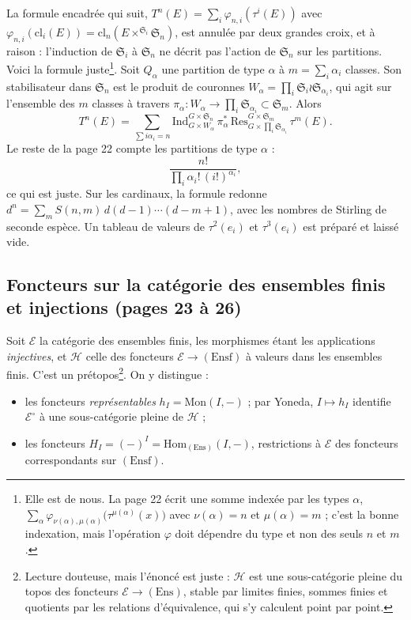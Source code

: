 \documentclass[11pt,a4paper]{article}
\begin{document}
La formule encadrée qui suit, $T^{n}(E) = \sum_i \varphi_{n,i}(\tau^{i}(E))$
avec $\varphi_{n,i}(\mathrm{cl}_i(E)) = \mathrm{cl}_n(E
\times^{\mathfrak{S}_i} \mathfrak{S}_n)$, est annulée par deux grandes
croix, et à raison : l'induction de $\mathfrak{S}_i$ à $\mathfrak{S}_n$ ne
décrit pas l'action de $\mathfrak{S}_n$ sur les partitions. Voici la formule
juste\footnote{Elle est de nous. La page 22 écrit une somme indexée par les
types $\alpha$, $\sum_\alpha \varphi_{\nu(\alpha), \mu(\alpha)}\bigl(
\tau^{\mu(\alpha)}(x)\bigr)$ avec $\nu(\alpha) = n$ et $\mu(\alpha) = m$ ;
c'est la bonne indexation, mais l'opération $\varphi$ doit dépendre du type
et non des seuls $n$ et $m$.}. Soit $Q_\alpha$ une partition de type
$\alpha$ à $m = \sum_i \alpha_i$ classes. Son stabilisateur dans
$\mathfrak{S}_n$ est le produit de couronnes
$W_\alpha = \prod_i \mathfrak{S}_i \wr \mathfrak{S}_{\alpha_i}$, qui agit sur
l'ensemble des $m$ classes à travers
$\pi_\alpha \colon W_\alpha \to \prod_i \mathfrak{S}_{\alpha_i} \subset
\mathfrak{S}_m$. Alors
\[
T^{n}(E) = \sum_{\sum i\alpha_i = n}
\mathrm{Ind}_{G \times W_\alpha}^{G \times \mathfrak{S}_n}\,
\pi_\alpha^{*}\,
\mathrm{Res}^{G \times \mathfrak{S}_m}_{G \times \prod_i
\mathfrak{S}_{\alpha_i}}\, \tau^{m}(E).
\]
Le reste de la page 22 compte les partitions de type $\alpha$ :
\[
\frac{n!}{\prod_{i} \alpha_i!\,(i!)^{\alpha_i}},
\]
ce qui est juste. Sur les cardinaux, la formule redonne
$d^{n} = \sum_m S(n, m)\, d(d-1)\cdots(d-m+1)$, avec les nombres de Stirling
de seconde espèce. Un tableau de valeurs de $\tau^{2}(e_i)$ et
$\tau^{3}(e_i)$ est préparé et laissé vide.

\subsection*{Foncteurs sur la catégorie des ensembles finis et injections (pages 23 à 26)}

Soit $\mathcal{E}$ la catégorie des ensembles finis, les morphismes étant
les applications \emph{injectives}, et $\mathcal{H}$ celle des foncteurs
$\mathcal{E} \to (\mathrm{Ensf})$ à valeurs dans les ensembles finis. C'est
un prétopos\footnote{Lecture douteuse, mais l'énoncé est juste :
$\mathcal{H}$ est une sous-catégorie pleine du topos des foncteurs
$\mathcal{E} \to (\mathrm{Ens})$, stable par limites finies, sommes finies
et quotients par les relations d'équivalence, qui s'y calculent point par
point.}. On y distingue :
\begin{itemize}
  \item les foncteurs \emph{représentables} $h_I = \mathrm{Mon}(I, -)$ ;
  par Yoneda, $I \mapsto h_I$ identifie $\mathcal{E}^{\circ}$ à une
  sous-catégorie pleine de $\mathcal{H}$ ;
  \item les foncteurs $H_I = (-)^{I} = \mathrm{Hom}_{(\mathrm{Ens})}(I, -)$,
  restrictions à $\mathcal{E}$ des foncteurs correspondants sur
  $(\mathrm{Ensf})$.
\end{itemize}
\end{document}
